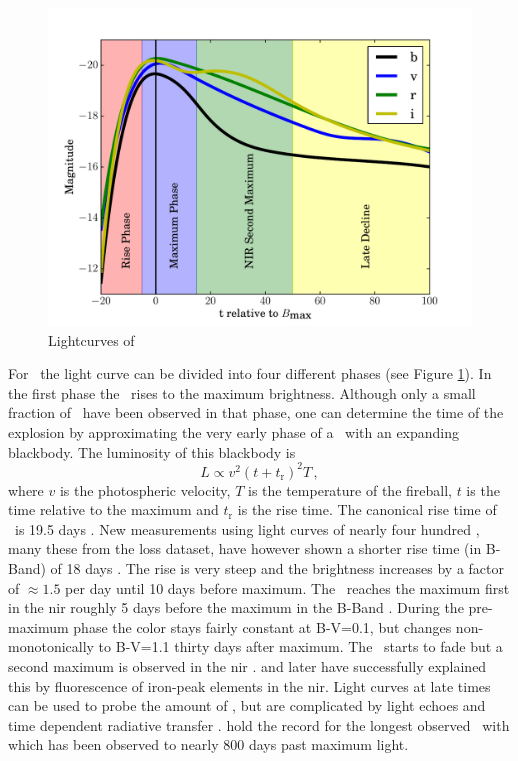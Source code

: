 \begin{figure}[htb] %
   \centering
   \includegraphics[width=\textwidth]{chapter_intro/plots/lightcurve_2002bo.pdf} 
   \caption{Lightcurves of  \citep[data from ][]{2004MNRAS.348..261B}}
   \label{fig:lightcurve_2002bo}
\end{figure}

For \sneia\ the light curve can be divided into four different phases (see Figure \ref{fig:lightcurve_2002bo}). In the first phase the \snia\  rises to the maximum brightness. Although only a small fraction of \sneia\ have been observed in that phase, one can determine the time of the explosion by approximating the very early phase of a \snia\ with an expanding blackbody. The luminosity of this blackbody is 
\[L\propto v^2 (t+t_\textrm{r})^2 T\,,\]
where $v$ is the photospheric velocity, $T$ is the temperature of the fireball, $t$ is the time relative to the maximum and $t_\textrm{r}$ is the rise time. The canonical rise time of \sneia\ is 19.5 days \citep{1999AJ....118.2675R}. New measurements using light curves of nearly four hundred \sneia, many these from the \gls{loss} dataset, have however shown a shorter rise time (in B-Band) of 18 days \citep{2011arXiv1107.2404G}. The rise is very steep and the brightness increases by a factor of $\approx 1.5$ per day until 10 days before maximum. The \snia\ reaches the maximum first in the \gls{nir} roughly 5 days before the maximum in the B-Band \citep{2000MNRAS.314..782M}. During the pre-maximum phase the color stays fairly constant at B-V=0.1, but changes non-monotonically to B-V=1.1 thirty days after maximum. The \snia\ starts to fade but  a second maximum is observed in the \gls{nir} \citep{2008ApJ...689..377W}. \citet{2000ApJ...530..757P} and later \citet{2006ApJ...649..939K} have successfully explained this by fluorescence of iron-peak elements in the \gls{nir}. Light curves at late times can be used to probe the amount of , but are complicated by light echoes \cite[e.g.][]{1994ApJ...434L..19S} and time dependent radiative transfer \citep{2005A&A...437..983K}. \citet{2009A&A...505..265L} hold the record for the longest observed \sneia\ with  which has been observed to nearly 800 days past maximum light.  

